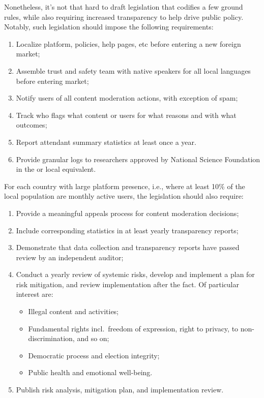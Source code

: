 Nonetheless, it's not that hard to draft legislation that codifies a few ground
rules, while also requiring increased transparency to help drive public policy.
Notably, such legislation should impose the following requirements:
\begin{enumerate}
    \item Localize platform, policies, help pages, etc before entering
        a new foreign market; \label{itm:law:localized}
    \item Assemble trust and safety team with native speakers for all local
        languages before entering market; \label{itm:law:team}
    \item Notify users of all content moderation actions, with exception of spam;
    \item Track who flags what content or users for what reasons and with what
        outcomes;
    \item Report attendant summary statistics at least once a year.
    \item Provide granular logs to researchers approved by National Science
        Foundation in the  or local equivalent. \label{itm:law:research}
\end{enumerate}
For each country with large platform presence, i.e., where at least 10\% of the
local population are monthly active users, the legislation should also require:
\begin{enumerate}[resume]
    \item Provide a meaningful appeals process for content moderation decisions;
        \label{itm:law:appeals}
    \item Include corresponding statistics in at least yearly transparency
        reports;
    \item Demonstrate that data collection and transparency reports have passed
        review by an independent auditor;
    \item Conduct a yearly review of systemic risks, develop and implement a
        plan for risk mitigation, and review implementation after the fact. Of
        particular interest are:
        \begin{itemize}
            \item Illegal content and activities;
            \item Fundamental rights incl.\ freedom of expression, right to
                privacy, to non-discrimination, and so on;
            \item Democratic process and election integrity;
            \item Public health and emotional well-being.
        \end{itemize} \label{itm:risk:review}
    \item Publish risk analysis, mitigation plan, and implementation review.
        \label{itm:law:publicrisk}
\end{enumerate}
